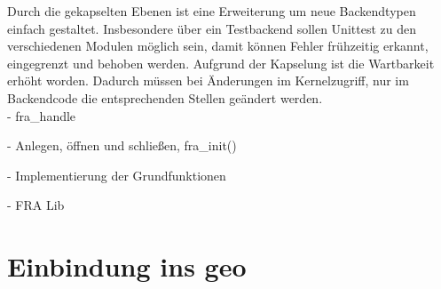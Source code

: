 Durch die gekapselten Ebenen ist eine Erweiterung um neue Backendtypen einfach gestaltet.  Insbesondere über ein Testbackend sollen Unittest zu den verschiedenen Modulen möglich sein, damit können Fehler frühzeitig erkannt, eingegrenzt und behoben werden. 
Aufgrund der Kapselung ist die Wartbarkeit erhöht worden. Dadurch müssen bei Änderungen im Kernelzugriff, nur im Backendcode die entsprechenden Stellen geändert werden.\\

 

- fra\_handle

- Anlegen, öffnen und schließen, fra\_init()

- Implementierung der Grundfunktionen

- FRA Lib



\section{Einbindung ins \acl{geo}}\label{sec:soft}












